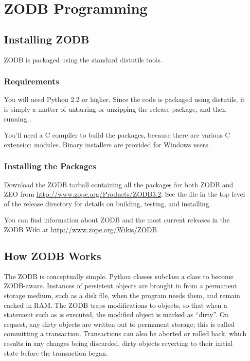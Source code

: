 
   

\section{ZODB Programming}

\subsection{Installing ZODB}

ZODB is packaged using the standard distutils tools.

\subsubsection{Requirements}

You will need Python 2.2 or higher.  Since the code is packaged using
distutils, it is simply a matter of untarring or unzipping the release
package, and then running .

You'll need a C compiler to build the packages, because there are
various C extension modules.  Binary installers are provided for
Windows users.

\subsubsection{Installing the Packages}

Download the ZODB tarball containing all the packages for both ZODB
and ZEO from \url{http://www.zope.org/Products/ZODB3.2}.  See
the  file in the top level of the release directory
for details on building, testing, and installing.

You can find information about ZODB and the most current releases in
the ZODB Wiki at \url{http://www.zope.org/Wikis/ZODB}.

\subsection{How ZODB Works}

The ZODB is conceptually simple.  Python classes subclass a 
 class to become ZODB-aware. 
Instances of persistent objects are brought in from a permanent
storage medium, such as a disk file, when the program needs them, and
remain cached in RAM.  The ZODB traps modifications to objects, so
that when a statement such as  is executed, the
modified object is marked as ``dirty''.  On request, any dirty objects
are written out to permanent storage; this is called committing a
transaction.  Transactions can also be aborted or rolled back, which
results in any changes being discarded, dirty objects reverting to
their initial state before the transaction began.

